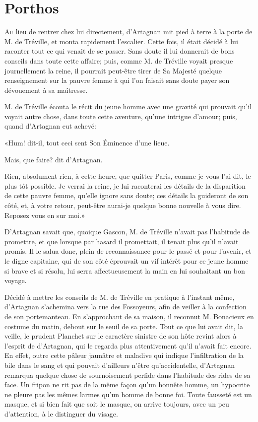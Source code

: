 
\chapter{Porthos}

\lettrine{A}{u} lieu de rentrer chez lui directement, d'Artagnan mit pied à terre à la porte de M. de Tréville, et monta rapidement l'escalier. Cette fois, il était décidé à lui raconter tout ce qui venait de se passer. Sans doute il lui donnerait de bons conseils dans toute cette affaire; puis, comme M. de Tréville voyait presque journellement la reine, il pourrait peut-être tirer de Sa Majesté quelque renseignement sur la pauvre femme à qui l'on faisait sans doute payer son dévouement à sa maîtresse. 

M. de Tréville écouta le récit du jeune homme avec une gravité qui prouvait qu'il voyait autre chose, dans toute cette aventure, qu'une intrigue d'amour; puis, quand d'Artagnan eut achevé: 

«Hum! dit-il, tout ceci sent Son Éminence d'une lieue. 

\speak  Mais, que faire? dit d'Artagnan. 

\speak  Rien, absolument rien, à cette heure, que quitter Paris, comme je vous l'ai dit, le plus tôt possible. Je verrai la reine, je lui raconterai les détails de la disparition de cette pauvre femme, qu'elle ignore sans doute; ces détails la guideront de son côté, et, à votre retour, peut-être aurai-je quelque bonne nouvelle à vous dire. Reposez vous en sur moi.» 

D'Artagnan savait que, quoique Gascon, M. de Tréville n'avait pas l'habitude de promettre, et que lorsque par hasard il promettait, il tenait plus qu'il n'avait promis. Il le salua donc, plein de reconnaissance pour le passé et pour l'avenir, et le digne capitaine, qui de son côté éprouvait un vif intérêt pour ce jeune homme si brave et si résolu, lui serra affectueusement la main en lui souhaitant un bon voyage. 

Décidé à mettre les conseils de M. de Tréville en pratique à l'instant même, d'Artagnan s'achemina vers la rue des Fossoyeurs, afin de veiller à la confection de son portemanteau. En s'approchant de sa maison, il reconnut M. Bonacieux en costume du matin, debout sur le seuil de sa porte. Tout ce que lui avait dit, la veille, le prudent Planchet sur le caractère sinistre de son hôte revint alors à l'esprit de d'Artagnan, qui le regarda plus attentivement qu'il n'avait fait encore. En effet, outre cette pâleur jaunâtre et maladive qui indique l'infiltration de la bile dans le sang et qui pouvait d'ailleurs n'être qu'accidentelle, d'Artagnan remarqua quelque chose de sournoisement perfide dans l'habitude des rides de sa face. Un fripon ne rit pas de la même façon qu'un honnête homme, un hypocrite ne pleure pas les mêmes larmes qu'un homme de bonne foi. Toute fausseté est un masque, et si bien fait que soit le masque, on arrive toujours, avec un peu d'attention, à le distinguer du visage. 

